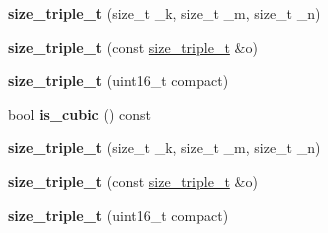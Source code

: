 \begin{DoxyCompactItemize}
{\bfseries size\+\_\+triple\+\_\+t} (size\+\_\+t \+\_\+k, size\+\_\+t \+\_\+m, size\+\_\+t \+\_\+n)
\item 
\mbox{\label{structsize__triple__t_a0e96c9188a766d1c4fd5cfc5cf6dc7a7}} 
{\bfseries size\+\_\+triple\+\_\+t} (const \hyperlink{structsize__triple__t}{size\+\_\+triple\+\_\+t} \&o)
\item 
\mbox{\label{structsize__triple__t_af10cc6003ebfaebb5b4cad99f022e857}} 
{\bfseries size\+\_\+triple\+\_\+t} (uint16\+\_\+t compact)
\item 
\mbox{\label{structsize__triple__t_a5d1fd357cb1c070f864bbf7713337c64}} 
bool {\bfseries is\+\_\+cubic} () const
\item 
\mbox{\label{structsize__triple__t_aeb3b790550c56b92d5b13acd87ea04e2}} 
{\bfseries size\+\_\+triple\+\_\+t} (size\+\_\+t \+\_\+k, size\+\_\+t \+\_\+m, size\+\_\+t \+\_\+n)
\item 
\mbox{\label{structsize__triple__t_a0e96c9188a766d1c4fd5cfc5cf6dc7a7}} 
{\bfseries size\+\_\+triple\+\_\+t} (const \hyperlink{structsize__triple__t}{size\+\_\+triple\+\_\+t} \&o)
\item 
\mbox{\label{structsize__triple__t_af10cc6003ebfaebb5b4cad99f022e857}} 
{\bfseries size\+\_\+triple\+\_\+t} (uint16\+\_\+t compact)
\end{DoxyCompactItemize}
